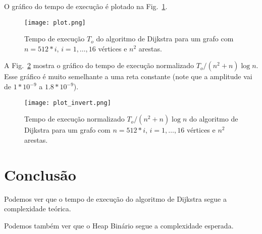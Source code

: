 \documentclass{article}
\begin{document}
O gráfico do tempo de execução é plotado na Fig.~\ref{fig1}.

\begin{figure}
  \centering
  \texttt{[image: plot.png]}
  \caption{Tempo de execução $T_o$ do algoritmo de Dijkstra para um grafo com $n=512 * i$, $i=1,\ldots,16$ vértices e $n ^ 2$ arestas.}
  \label{fig1}
\end{figure}

A Fig.~\ref{fig2} mostra o gráfico do tempo de execução normalizado $T_o/(n^2+n)\log n$. Esse gráfico é muito semelhante a uma reta constante (note que a amplitude vai de $1*10 ^ {-9}$ a $1.8 * 10 ^ {-9}$).

\begin{figure}
  \centering
  \texttt{[image: plot\_invert.png]}
  \caption{Tempo de execução normalizado $T_o/(n^2+n)\log n$ do algoritmo de Dijkstra para um grafo com $n=512 * i$, $i=1,\ldots,16$ vértices e $n ^ 2$ arestas.}
  \label{fig2}
\end{figure}

\section{Conclusão}

Podemos ver que o tempo de execução do algoritmo de Dijkstra segue a complexidade teórica.

Podemos também ver que o Heap Binário segue a complexidade esperada.

\printbibliography
\end{document}
